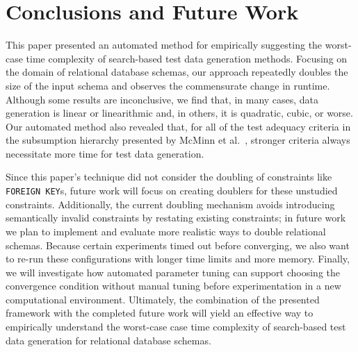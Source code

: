 
\vspace*{-.1in}
\section{Conclusions and Future Work}
\vspace*{-.1in}


This paper presented an automated method for empirically suggesting the worst-case time complexity of search-based test
data generation methods. Focusing on the domain of relational database schemas, our approach repeatedly doubles the size
of the input schema and observes the commensurate change in runtime. Although some results are inconclusive, we find
that, in many cases, data generation is linear or linearithmic and, in others, it is quadratic, cubic, or worse.  Our
automated method also revealed that, for all of the test adequacy criteria in the subsumption hierarchy presented by
McMinn et al.~\cite{mcminn2015}, stronger criteria always necessitate more time for test data generation.

Since this paper's technique did not consider the doubling of constraints like {\tt FOREIGN KEY}s, future work will
focus on creating doublers for these unstudied constraints. Additionally, the current doubling mechanism avoids
introducing semantically invalid constraints by restating existing constraints; in future work we plan to implement and
evaluate more realistic ways to double relational schemas. Because certain experiments timed out before converging, we
also want to re-run these configurations with longer time limits and more memory. Finally, we will investigate how
automated parameter tuning can support choosing the convergence condition without manual tuning before experimentation
in a new computational environment. Ultimately, the combination of the presented framework with the completed future
work will yield an effective way to empirically understand the worst-case case time complexity of search-based test data
generation for relational database schemas.

